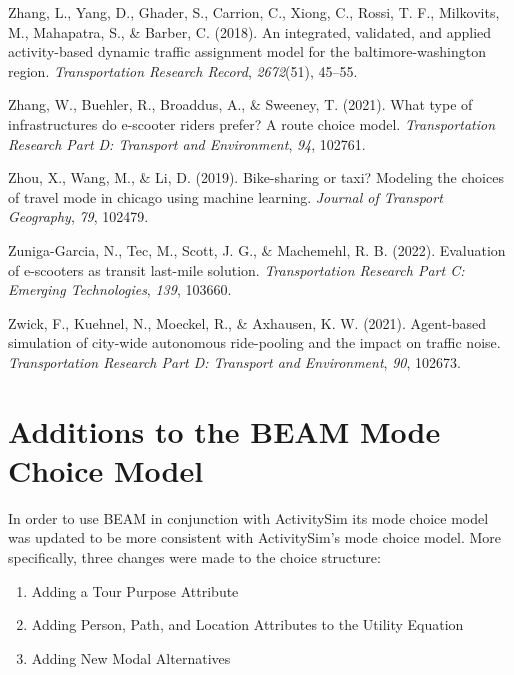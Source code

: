 \documentclass[fancy, masters]{byuthesis}
\newlength{\cslhangindent}
\newlength{\cslentryspacingunit} %
\newenvironment{CSLReferences}[2] %
 {%
  \setlength{\parindent}{0pt}
  \ifodd #1
  \let\oldpar\par
  \def\par{\hangindent=\cslhangindent\oldpar}
  \fi
  \setlength{\parskip}{#2\cslentryspacingunit}
 }%
 {}
\providecommand{\tightlist}{%
  \setlength{\itemsep}{0pt}\setlength{\parskip}{0pt}}
\begin{document}
\begin{CSLReferences}{1}{0}
\leavevmode{}%
Zhang, L., Yang, D., Ghader, S., Carrion, C., Xiong, C., Rossi, T. F., Milkovits, M., Mahapatra, S., \& Barber, C. (2018). An integrated, validated, and applied activity-based dynamic traffic assignment model for the baltimore-washington region. \emph{Transportation Research Record}, \emph{2672}(51), 45--55.

\leavevmode{}%
Zhang, W., Buehler, R., Broaddus, A., \& Sweeney, T. (2021). What type of infrastructures do e-scooter riders prefer? A route choice model. \emph{Transportation Research Part D: Transport and Environment}, \emph{94}, 102761.

\leavevmode{}%
Zhou, X., Wang, M., \& Li, D. (2019). Bike-sharing or taxi? Modeling the choices of travel mode in chicago using machine learning. \emph{Journal of Transport Geography}, \emph{79}, 102479.

\leavevmode{}%
Zuniga-Garcia, N., Tec, M., Scott, J. G., \& Machemehl, R. B. (2022). Evaluation of e-scooters as transit last-mile solution. \emph{Transportation Research Part C: Emerging Technologies}, \emph{139}, 103660.

\leavevmode{}%
Zwick, F., Kuehnel, N., Moeckel, R., \& Axhausen, K. W. (2021). Agent-based simulation of city-wide autonomous ride-pooling and the impact on traffic noise. \emph{Transportation Research Part D: Transport and Environment}, \emph{90}, 102673.

\end{CSLReferences}

\hypertarget{appendix-appendix}{%
\appendix}


\hypertarget{apexA}{%
\chapter{Additions to the BEAM Mode Choice Model}\label{apexA}}

In order to use BEAM in conjunction with ActivitySim its mode choice model was updated to be more consistent with ActivitySim's mode choice model. More specifically, three changes were made to the choice structure:

\begin{enumerate}
\def\labelenumi{\arabic{enumi}.}
\tightlist
\item
  Adding a Tour Purpose Attribute
\item
  Adding Person, Path, and Location Attributes to the Utility Equation
\item
  Adding New Modal Alternatives
\end{enumerate}
\end{document}
